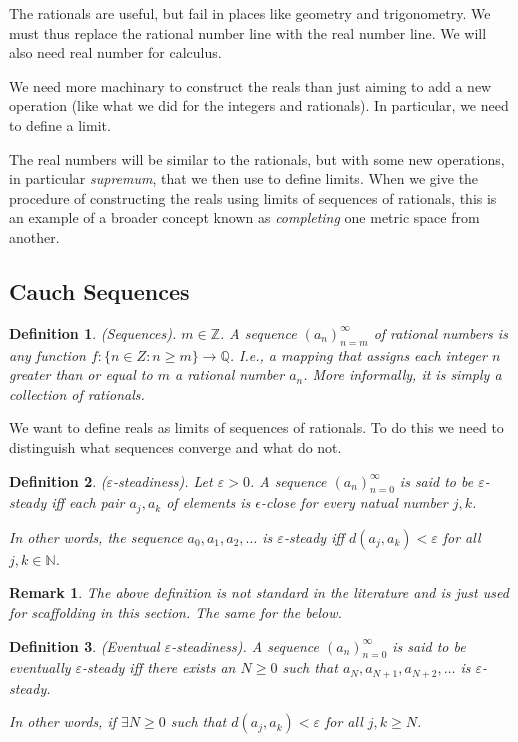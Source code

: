 \documentclass{article}
\newtheorem{definition}{Definition}[subsection]
\newtheorem{remark}{Remark}[subsection]
\newcommand{\Q}{\mathbb{Q}}
\newcommand{\Z}{\mathbb{Z}}
\newcommand{\N}{\mathbb{N}}
\newcommand{\vep}{\varepsilon} %
\let\it\textit
\begin{document}
The rationals are useful, but fail in places like geometry
and trigonometry. We must thus replace the rational number 
line with the real number line. We will also need real 
number for calculus.

We need more machinary to construct the reals than just 
aiming to add a new operation (like what we did for the integers 
and rationals). In particular, we need to define 
a limit. 

The real numbers will be similar to the rationals, but with 
some new operations, in particular \it{supremum}, that we then 
use to define limits. When we give the procedure of constructing
the reals using limits of sequences of rationals, this is an 
example of a broader concept known as \it{completing} one 
metric space from another.

\subsection{Cauch Sequences}

\begin{definition}
	(Sequences). $m\in\Z$. A sequence $(a_n)_{n=m}^{\infty}$ of 
	rational numbers is any function $f: \{n \in Z: n \geq m \} \to \Q$.
	I.e., a mapping that assigns each integer $n$  greater than or
	equal to $m$ a rational number $a_n$. More informally, it is 
	simply a collection of rationals.
\end{definition}

We want to define reals as limits of sequences of rationals. To 
do this we need to distinguish what sequences converge and what do not.

\begin{definition}
	($\vep$-steadiness). Let $\vep > 0$. A sequence $(a_n)_{n=0}^\infty$ 
	is said to be $\vep$-steady iff each pair $a_j, a_k$ of elements 
	is $\epsilon$-close for every natual number $j,k$. 

	In other words, the sequence $a_0, a_1, a_2, \dots$ is $\vep$-steady
	iff $d(a_j,a_k) < \vep$ for all $j,k \in \N$.
\end{definition}

\begin{remark}
	The above definition is not standard in the literature and 
	is just used for scaffolding in this section. The same 
	for the below.
\end{remark}

\begin{definition}
	(Eventual $\vep$-steadiness). A sequence $(a_n)_{n=0}^\infty$	
	is said to be eventually $\vep$-steady iff there exists
	an $N \geq 0$ such that $a_N, a_{N+1}, a_{N+2}, \dots$ is 
	$\vep$-steady.

	In other words, if $\exists N \geq 0$ such that 
	$d(a_j, a_k) < \vep$ for all $j,k \geq N$.
\end{definition}
\end{document}
